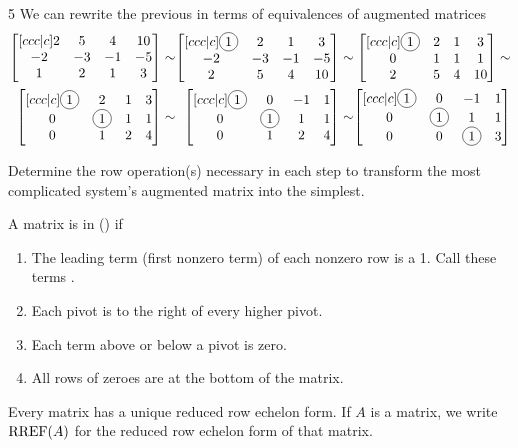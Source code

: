 \begin{activity}{5}
We can rewrite the previous in terms of  equivalences of augmented matrices
\[
	\begin{alignedat}{3}
		\begin{bmatrix}[ccc|c] 2 & 5 & 4 & 10 \\ -2 & -3 & -1 & -5 \\ 1 & 2 & 1 & 3 \end{bmatrix} & \sim &
		\begin{bmatrix}[ccc|c] \circledNumber{1} & 2 & 1 & 3 \\ -2 & -3 & -1 & -5 \\ 2 & 5 & 4 & 10  \end{bmatrix} & \sim &
		\begin{bmatrix}[ccc|c] \circledNumber{1} & 2 & 1 & 3 \\ 0 & 1 & 1 & 1 \\ 2 & 5 & 4 & 10  \end{bmatrix} \sim  \\
		\begin{bmatrix}[ccc|c] \circledNumber{1} & 2 & 1 & 3 \\ 0 & \circledNumber{1} & 1 & 1 \\ 0 & 1 & 2 & 4  \end{bmatrix} & \sim &
		\begin{bmatrix}[ccc|c] \circledNumber{1} & 0 & -1 & 1 \\ 0 & \circledNumber{1} & 1 & 1 \\ 0 & 1 & 2 & 4  \end{bmatrix} & \sim &
		\begin{bmatrix}[ccc|c] \circledNumber{1} & 0 & -1 & 1 \\ 0 & \circledNumber{1} & 1 & 1 \\ 0 & 0 & \circledNumber{1} & 3  \end{bmatrix} 
 	\end{alignedat}
\]

		Determine the row operation(s) necessary in each step to transform the most complicated
    system's augmented matrix into the simplest.

\end{activity}

\begin{definition}
A matrix is in  () if
\begin{enumerate}
\item The leading term (first nonzero term) of each nonzero row is a 1.
      Call these terms .
\item Each pivot is to the right of every higher pivot.
\item Each term above or below a pivot is zero.
\item All rows of zeroes are at the bottom of the matrix.
\end{enumerate}
\vfill
Every matrix has a unique reduced row echelon form. If \(A\) is a matrix, we write \(\operatorname{RREF}(A)\) for the reduced row echelon form of that matrix.
\end{definition}

